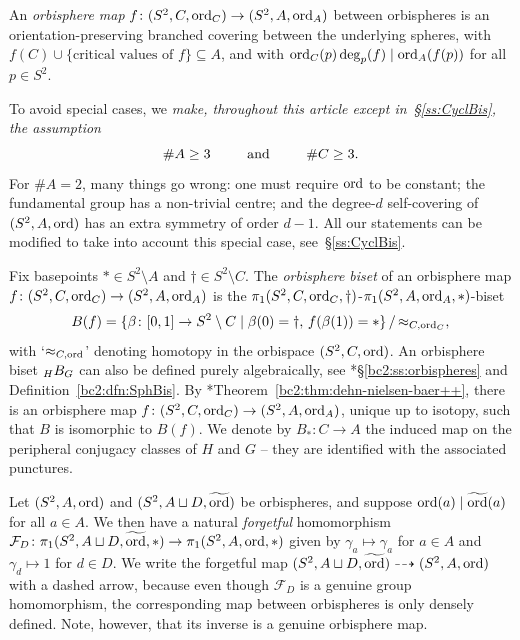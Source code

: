 \documentclass{amsart}
\newcommand\Forget{{\mathcal F}}
\newcommand\wtord{{\widetilde\ord}}
\begin{document}
An \emph{orbisphere map} $f\colon(S^2,C,\operatorname{ord}_C)\to(S^2,A,\operatorname{ord}_A)$
between orbispheres is an orientation-preserving branched covering
between the underlying spheres, with
$f(C)\cup\{\text{critical values of }f\}\subseteq A$, and with
$\operatorname{ord}_C(p)\deg_p(f)\mid\operatorname{ord}_A(f(p))$ for all $p\in S^2$.

To avoid special cases, we \emph{make, throughout this article except
  in~\S\ref{ss:CyclBis}, the assumption}
   \begin{equation}
   \label{eq:StandAssump}
  \#A\ge3 \hspace{0.8cm} \text{ and } \hspace{0.8cm}\#C\ge3.
  \end{equation} For $\#A=2$, many things go wrong: one must
require $\operatorname{ord}$ to be constant; the fundamental group has a non-trivial
centre; and the degree-$d$ self-covering of $(S^2,A,\operatorname{ord})$ has an
extra symmetry of order $d-1$. All our statements can be modified to
take into account this special case, see~\S\ref{ss:CyclBis}.

Fix basepoints $*\in S^2\setminus A$ and $\dagger\in S^2\setminus
C$. The \emph{orbisphere biset} of an orbisphere map
$f\colon(S^2,C,\operatorname{ord}_C)\to(S^2,A,\operatorname{ord}_A)$ is the
$\pi_1(S^2,C,\operatorname{ord}_C,\dagger)$-$\pi_1(S^2,A,\operatorname{ord}_A,*)$-biset
\[B(f)=\{\beta\colon[0,1]\to S^2\setminus
  C\mid\beta(0)=\dagger,\,f(\beta(1))=*\}\,/\,{\approx_{C,\operatorname{ord}_C}},\]
with `$\approx_{C,\operatorname{ord}}$' denoting homotopy in the orbispace
$(S^2,C,\operatorname{ord})$.  An orbisphere biset $\subscript H B_G$ can also be
defined purely algebraically, see
\cite{bartholdi-dudko:bc2}*{\S\ref{bc2:ss:orbispheres} and
  Definition~\ref{bc2:dfn:SphBis}}. By
\cite{bartholdi-dudko:bc2}*{Theorem~\ref{bc2:thm:dehn-nielsen-baer++}},
there is an orbisphere map $f\colon(S^2,C,\operatorname{ord}_C)\to(S^2,A,\operatorname{ord}_A)$,
unique up to isotopy, such that $B$ is isomorphic to $B(f)$. We denote
by $B_*\colon C\to A$ the induced map on the peripheral conjugacy
classes of $H$ and $G$ -- they are identified with the associated
punctures.

Let $(S^2,A,\operatorname{ord})$ and $(S^2,A\sqcup D,\wtord)$ be
orbispheres, and suppose $\ord(a)\mid\wtord(a)$ for all
$a\in A$. We then have a natural \emph{forgetful} homomorphism
$\Forget_D\colon\pi_1(S^2,A\sqcup
D,\wtord,*)\to\pi_1(S^2,A,\ord,*)$ given by
$\gamma_a\mapsto\gamma_a$ for $a\in A$ and $\gamma_d\mapsto1$ for
$d\in D$. We write the forgetful map
$(S^2,A\sqcup D,\wtord)\dashrightarrow(S^2,A,\ord)$ with a
dashed arrow, because even though $\Forget_D$ is a genuine group
homomorphism, the corresponding map between orbispheres is only
densely defined. Note, however, that its inverse is a genuine
orbisphere map.  
\end{document}
